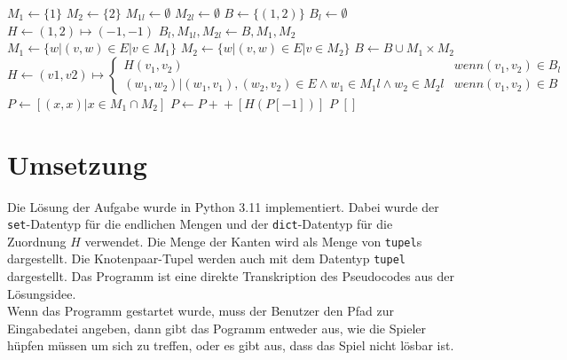 \documentclass[a4paper,10pt,ngerman]{scrartcl}
\begin{document}
\begin{algorithmic}
  \State$M_1 \gets \{1\}$
  \State$M_2 \gets \{2\}$
  \State$M_{1l} \gets \emptyset$
  \State$M_{2l} \gets \emptyset$
  \State$B \gets \{(1, 2)\}$
  \State$B_l \gets \emptyset$
  \State$H \gets (1, 2) \mapsto (-1, -1)$
  \State$B_l, M_{1l}, M_{2l} \gets B, M_1, M_2$
  \State$M_1 \gets \{w | (v, w) \in E | v \in M_1\} $
  \State$M_2 \gets \{w | (v, w) \in E | v \in M_2\} $
  \State$B \gets B \cup M_1 \times M_2$
  \State$H \gets (v1, v2) \mapsto \begin{cases}
      H(v_1, v_2)                                                                 & wenn (v_1,v_2) \in B_l \\
      (w_1, w_2)|(w_1,v_1), (w_2,v_2) \in E \land w_1 \in M_1l \land w_2 \in M_2l & wenn (v_1,v_2) \in B
    \end{cases}$
  \EndWhile
  \State$P \gets [(x,x) | x \in M_1 \cap M_2]$
  \State$P \gets P +\!\!\!+ [H(P[-1])]$
  \EndWhile
  \State \Return $P$
  \Else
  \State \Return $[]$
  \EndIf
\end{algorithmic}
\section{Umsetzung}
Die Lösung der Aufgabe wurde in Python 3.11 implementiert. Dabei wurde der
\lstinline|set|-Datentyp für die endlichen Mengen und der
\lstinline|dict|-Datentyp für die Zuordnung $H$ verwendet. Die Menge der Kanten
wird als Menge von \lstinline|tupel|s dargestellt. Die Knotenpaar-Tupel werden
auch mit dem Datentyp \lstinline|tupel| dargestellt. Das Programm ist eine
direkte Transkription des Pseudocodes aus der Lösungsidee.\\
Wenn das Programm gestartet wurde, muss der Benutzer den Pfad zur Eingabedatei angeben, dann gibt das Pogramm entweder aus, wie die Spieler hüpfen müssen um sich zu treffen, oder es gibt aus, dass das Spiel nicht lösbar ist.\\
\end{document}
